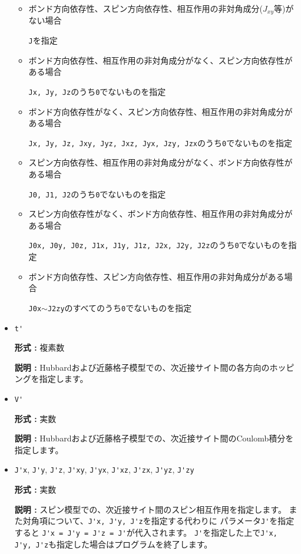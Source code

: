 \begin{itemize}
\begin{itemize}

\item ボンド方向依存性、スピン方向依存性、相互作用の非対角成分($J_{x y}$等)がない場合

\verb|J|を指定

\item ボンド方向依存性、相互作用の非対角成分がなく、スピン方向依存性がある場合

\verb|Jx, Jy, Jz|のうち\verb|0|でないものを指定

\item ボンド方向依存性がなく、スピン方向依存性、相互作用の非対角成分がある場合

\verb|Jx, Jy, Jz, Jxy, Jyz, Jxz, Jyx, Jzy, Jzx|のうち\verb|0|でないものを指定

\item スピン方向依存性、相互作用の非対角成分がなく、ボンド方向依存性がある場合

\verb|J0, J1, J2|のうち\verb|0|でないものを指定

\item スピン方向依存性がなく、ボンド方向依存性、相互作用の非対角成分がある場合

\verb|J0x, J0y, J0z, J1x, J1y, J1z, J2x, J2y, J2z|のうち\verb|0|でないものを指定

\item ボンド方向依存性、スピン方向依存性、相互作用の非対角成分がある場合

\verb|J0x|$\sim$\verb|J2zy|のすべてのうち\verb|0|でないものを指定

\end{itemize}
\item \verb|t'|

{\bf 形式 :} 複素数

{\bf 説明 :} Hubbardおよび近藤格子模型での、次近接サイト間の各方向のホッピングを指定します。

\item \verb|V'|

{\bf 形式 :} 実数

{\bf 説明 :} Hubbardおよび近藤格子模型での、次近接サイト間のCoulomb積分を指定します。

\item \verb|J'x|, \verb|J'y|, \verb|J'z|, \verb|J'xy|, 
  \verb|J'yx|, \verb|J'xz|, \verb|J'zx|, \verb|J'yz|, \verb|J'zy|

{\bf 形式 :} 実数

{\bf 説明 :} スピン模型での、次近接サイト間のスピン相互作用を指定します。
また対角項について、\verb|J'x, J'y, J'z|を指定する代わりに
パラメータ\verb|J'|を指定すると
\verb|J'x = J'y = J'z = J'|が代入されます。
\verb|J'|を指定した上で\verb|J'x, J'y, J'z|も指定した場合はプログラムを終了します。


\end{itemize}
